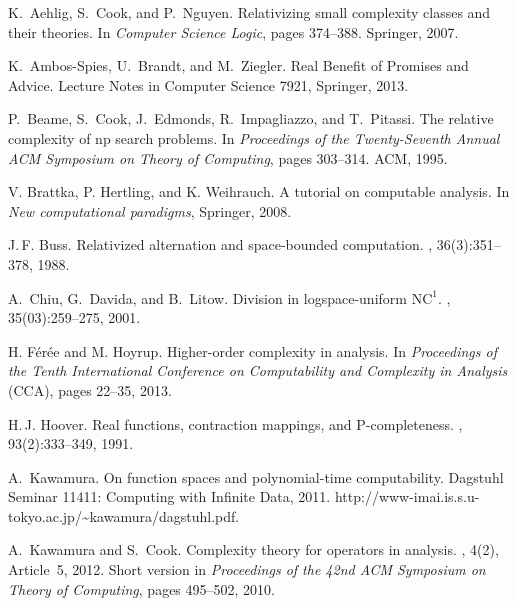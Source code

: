 \documentclass[conference]{IEEEtran}
\theoremstyle{definition}
\theoremstyle{remark}
\begin{document}
\begin{thebibliography}{10}

K.~Aehlig, S.~Cook, and P.~Nguyen.
\newblock Relativizing small complexity classes and their theories.
\newblock In {\em Computer Science Logic}, pages 374--388. Springer, 2007.

K.~Ambos-Spies, U.~Brandt, and M.~Ziegler. 
\newblock
Real Benefit of Promises and Advice. 
\newblock
Lecture Notes in Computer Science 7921, 
Springer, 2013. 

P.~Beame, S.~Cook, J.~Edmonds, R.~Impagliazzo, and T.~Pitassi.
\newblock The relative complexity of np search problems.
\newblock In {\em Proceedings of the Twenty-Seventh Annual ACM Symposium on
  Theory of Computing}, pages 303--314. ACM, 1995.

V. Brattka, P. Hertling, and K. Weihrauch. 
\newblock A tutorial on computable analysis. 
\newblock In \emph{New computational paradigms}, Springer, 2008. 


J.\,F. Buss.
\newblock Relativized alternation and space-bounded computation.
, 36(3):351--378, 1988.

A.~Chiu, G.~Davida, and B.~Litow.
\newblock Division in logspace-uniform $\mathrm{NC}^1$.
,
  35(03):259--275, 2001.

H. F\'er\'ee and M. Hoyrup. 
\newblock Higher-order complexity in analysis. 
\newblock In \emph{Proceedings of the Tenth International Conference on Computability and Complexity in Analysis} (CCA), pages 22--35, 2013.

H.\,J. Hoover.
\newblock Real functions, contraction mappings, and $\mathrm{P}$-completeness.
, 93(2):333--349, 1991.

A.~Kawamura.
\newblock On function spaces and polynomial-time computability.
\newblock Dagstuhl Seminar 11411: Computing with Infinite Data, 2011.
\newblock http://www-imai.is.s.u-tokyo.ac.jp/{\~{}}kawamura/dagstuhl.pdf.

A.~Kawamura and S.~Cook.
\newblock Complexity theory for operators in analysis.
, 4(2), Article~5, 2012.
\newblock Short version in \emph{Proceedings of the 42nd ACM Symposium on Theory of
  Computing}, pages 495--502, 2010.


\end{thebibliography}
\end{document}
